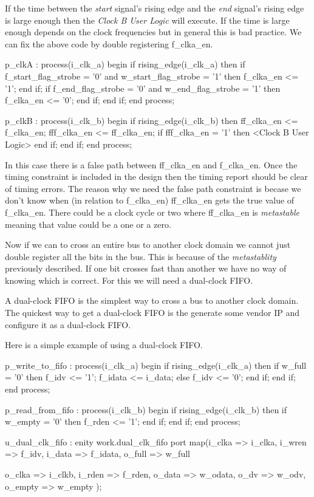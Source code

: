 If the time between the \emph{start} signal's rising edge and the \emph{end} signal's rising edge is large enough then the \emph{Clock B User Logic} will execute. If the time is large enough depends on the clock frequencies but in general this is bad practice. We can fix the above code by double registering f\_clka\_en. 

\begin{VHDLlisting}[tabsize=8]
p_clkA : process(i_clk_a)
begin
	if rising_edge(i_clk_a) then
		if f_start_flag_strobe = '0' and w_start_flag_strobe = '1' then
			f_clka_en <= '1';
		end if;
		if f_end_flag_strobe = '0' and w_end_flag_strobe = '1' then
			f_clka_en <= '0';
		end if;
	end if;
end process;

p_clkB : process(i_clk_b)
begin
	if rising_edge(i_clk_b) then
		ff_clka_en <= f_clka_en;
		fff_clka_en <= ff_clka_en;
		if fff_clka_en = '1' then
			<Clock B User Logic>
		end if;
	end if;
end process;
\end{VHDLlisting}	

In this case there is a false path between ff\_clka\_en and f\_clka\_en. Once the timing constraint is included in the design then the timing report should be clear of timing errors. The reason why we need the false path constraint is becase we don't know when (in relation to f\_clka\_en) ff\_clka\_en gets the true value of f\_clka\_en. There could be a clock cycle or two where ff\_clka\_en is \emph{metastable} meaning that value could be a one or a zero. 

Now if we can to cross an entire bus to another clock domain we cannot just double register all the bits in the bus. This is because of the \emph{metastablity} previously described. If one bit crosses fast than another we have no way of knowing which is correct. For this we will need a dual-clock \ac{FIFO}. 

A dual-clock \ac{FIFO} is the simplest way to cross a bus to another clock domain. The quickest way to get a dual-clock \ac{FIFO} is the generate some vendor \ac{IP} and configure it as a dual-clock \ac{FIFO}. 

Here is a simple example of using a dual-clock \ac{FIFO}.

\begin{VHDLlisting}[tabsize=8]
p_write_to_fifo : process(i_clk_a)
begin
	if rising_edge(i_clk_a) then
		if w_full = '0' then
			f_idv <= '1';
			f_idata <= i_data;
		else
			f_idv <= '0';
		end if;
	end if;	
end process;

p_read_from_fifo : process(i_clk_b)
begin	
	if rising_edge(i_clk_b) then
		if w_empty = '0' then
			f_rden <= '1';
		end if;
	end if;
end process;

u_dual_clk_fifo : enity work.dual_clk_fifo
port map(i_clka  => i_clka, 
		 i_wren  => f_idv,
		 i_data  => f_idata,
		 o_full  => w_full
		 
		 o_clka  => i_clkb,
		 i_rden  => f_rden,
		 o_data  => w_odata,
		 o_dv    => w_odv,
		 o_empty => w_empty
);
\end{VHDLlisting}

